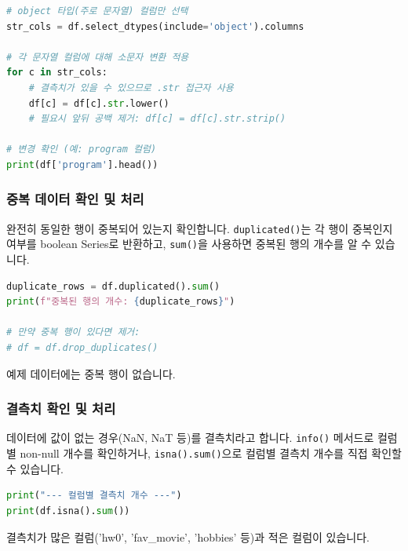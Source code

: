 \documentclass[11pt,a4paper]{book}
\theoremstyle{definition}
\begin{document}
\begin{codeexamplebox}
\begin{lstlisting}[language=Python, caption={텍스트 소문자 변환}, label={lst:text_lower}, breaklines=true]
# object 타입(주로 문자열) 컬럼만 선택
str_cols = df.select_dtypes(include='object').columns

# 각 문자열 컬럼에 대해 소문자 변환 적용
for c in str_cols:
    # 결측치가 있을 수 있으므로 .str 접근자 사용
    df[c] = df[c].str.lower()
    # 필요시 앞뒤 공백 제거: df[c] = df[c].str.strip()

# 변경 확인 (예: program 컬럼)
print(df['program'].head())
\end{lstlisting}
\end{codeexamplebox}

\subsubsection{중복 데이터 확인 및 처리}

완전히 동일한 행이 중복되어 있는지 확인합니다. \texttt{duplicated()}는 각 행이 중복인지 여부를 boolean Series로 반환하고, \texttt{sum()}을 사용하면 중복된 행의 개수를 알 수 있습니다.

\begin{codeexamplebox}
\begin{lstlisting}[language=Python, caption={중복 행 확인}, label={lst:check_duplicates}, breaklines=true]
duplicate_rows = df.duplicated().sum()
print(f"중복된 행의 개수: {duplicate_rows}")

# 만약 중복 행이 있다면 제거:
# df = df.drop_duplicates()
\end{lstlisting}
\end{codeexamplebox}
예제 데이터에는 중복 행이 없습니다.

\subsubsection{결측치 확인 및 처리}

데이터에 값이 없는 경우(NaN, NaT 등)를 결측치라고 합니다. \texttt{info()} 메서드로 컬럼별 non-null 개수를 확인하거나, \texttt{isna().sum()}으로 컬럼별 결측치 개수를 직접 확인할 수 있습니다.

\begin{codeexamplebox}
\begin{lstlisting}[language=Python, caption={컬럼별 결측치 개수 확인}, label={lst:check_na}, breaklines=true]
print("--- 컬럼별 결측치 개수 ---")
print(df.isna().sum())
\end{lstlisting}
\end{codeexamplebox}
결측치가 많은 컬럼('hw0', 'fav\_movie', 'hobbies' 등)과 적은 컬럼이 있습니다.
\end{document}
